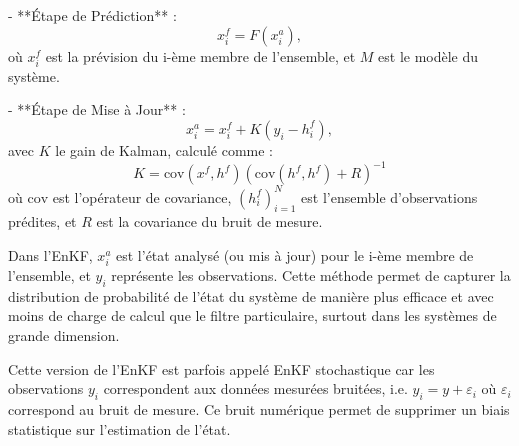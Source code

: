 - **Étape de Prédiction** :
$$x_i^f = F(x_i^a),$$
où $x_{i}^{f}$ est la prévision du i-ème membre de l'ensemble, et $M$ est le modèle du système.

- **Étape de Mise à Jour** :
$$x_{i}^{a} = x_{i}^{f} + K(y_{i} - h_i^f),$$
avec $K$ le gain de Kalman, calculé comme :
$$K = \text{cov}(x^f, h^f)(\text{cov}(h^f, h^f) + R)^{-1}$$
où $\text{cov}$ est l'opérateur de covariance, $(h_i^f)_{i=1}^N$ est l'ensemble d'observations prédites, et $R$ est la covariance du bruit de mesure.

Dans l'EnKF, $x_{i}^{a}$ est l'état analysé (ou mis à jour) pour le i-ème membre de l'ensemble, et $y_i$ représente les observations. Cette méthode permet de capturer la distribution de probabilité de l'état du système de manière plus efficace et avec moins de charge de calcul que le filtre particulaire, surtout dans les systèmes de grande dimension.

Cette version de l'EnKF est parfois appelé EnKF stochastique car les observations $y_i$ correspondent aux données mesurées bruitées, i.e. $y_i = y + \varepsilon_i$ où $\varepsilon_i$ correspond au bruit de mesure. Ce bruit numérique permet de supprimer un biais statistique sur l'estimation de l'état.

